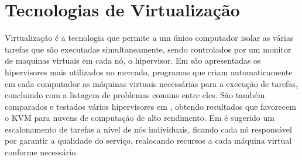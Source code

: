 

\section{Tecnologias de Virtualização}
Virtualização é a tecnologia que permite a um único computador isolar as várias tarefas que são executadas simultaneamente, sendo controlados por um monitor de maquinas virtuais em cada nó, o hipervisor. Em \cite{gu2012state} são apresentadas os hipervisores mais utilizados no mercado, programas que criam automaticamente em cada computador as máquinas virtuais necessárias para a execução de tarefas, concluindo com a listagem de problemas comuns entre eles. São também comparados e testados vários hipervisores em \cite{younge2011analysis}, obtendo resultados que favorecem o KVM para nuvens de computação de alto rendimento. 
Em \cite{cucinotta2011providing} é sugerido um escalonamento de tarefas a nível de nós individuais, ficando cada nó responsável por garantir a qualidade do serviço, realocando recursos a cada máquina virtual conforme necessário.

